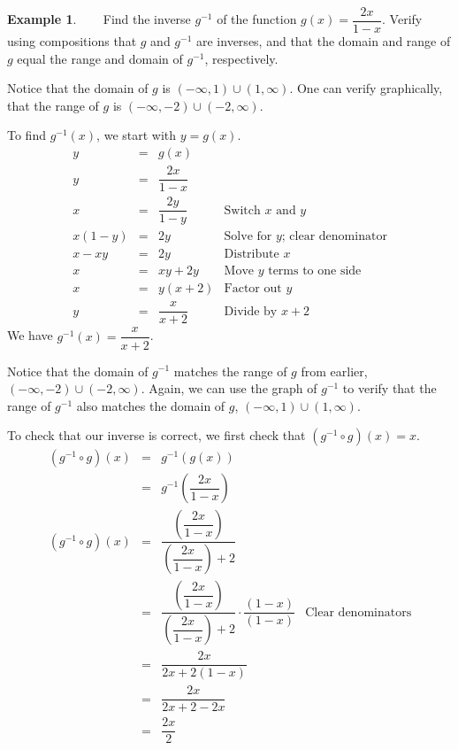 \documentclass[12pt]{book}
\theoremstyle{definition}
\newtheorem{example}{Example}
\begin{document}
\begin{example}~~~  Find the inverse $g^{-1}$ of the function $g(x) = \dfrac{2x}{1-x}$.  Verify using compositions that $g$ and $g^{-1}$ are inverses, and that the domain and range of $g$ equal the range and domain of $g^{-1}$, respectively.\par
Notice that the domain of $g$ is $(-\infty,1) \cup (1, \infty)$.  One can verify graphically, that the range of $g$ is $(-\infty,-2) \cup (-2, \infty)$.\par
To find $g^{-1}(x)$, we start with $y=g(x)$.
\[ \begin{array}{rcll}
y & = & g(x) & \\ [5pt]
y & = &  \dfrac{2x}{1-x} & \\ [7pt]
x & = & \dfrac{2y}{1-y} & \mbox{Switch $x$ and $y$} \\ [3pt]
x(1-y) & = & 2y & \mbox{Solve for $y$; clear denominator} \\ [3pt]
x-xy & = & 2y & \mbox{Distribute $x$}\\ [3pt]
x & = & xy + 2y & \mbox{Move $y$ terms to one side}\\ [3pt]
x & = & y(x+2) & \mbox{Factor out $y$}\\ [8pt]
y & = & \dfrac{x}{x+2} & \mbox{Divide by $x+2$}
\end{array} \]
We have $g^{-1}(x) = \dfrac{x}{x+2}$.\par
Notice that the domain of $g^{-1}$ matches the range of $g$ from earlier,
$(-\infty,-2) \cup (-2, \infty)$.  Again, we can use the graph of $g^{-1}$ to verify that the range of $g^{-1}$ also matches the domain of $g$, $(-\infty,1) \cup (1, \infty)$.\par
To check that our inverse is correct, we first check that $\left(g^{-1} \circ g \right)(x) = x $.
\[ \begin{array}{rclr}
\left(g^{-1} \circ g \right)(x) & = & g^{-1}(g(x)) & \\ [7pt]
& = & g^{-1} \left(\dfrac{2x}{1-x}\right) & \\ [20pt]
\left(g^{-1} \circ g \right)(x) & = & \dfrac{ \left(\dfrac{2x}{1-x}\right)}{ \left(\dfrac{2x}{1-x}\right)+2} & \\ [30pt]
& = & \dfrac{ \left(\dfrac{2x}{1-x}\right)}{ \left(\dfrac{2x}{1-x}\right)+2} \cdot \dfrac{(1-x)}{(1-x)} & \mbox{Clear denominators} \\ [15pt]
& = & \dfrac{ 2x}{ 2x + 2(1-x)} & \\ [15pt]
& = & \dfrac{2x}{2x+2-2x} & \\ [15pt]
& = & \dfrac{2x}{2} & \\ [7pt]

\end{array}\]
\end{example}
\end{document}
